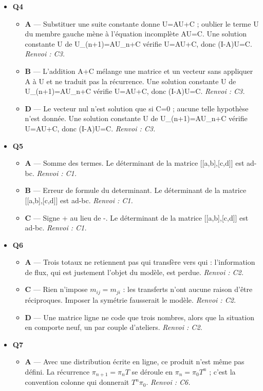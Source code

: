 \begin{itemize}
  \item \textbf{Q4}
  \begin{itemize}
    \item \textbf{A} — Substituer une suite constante donne U=AU+C ; oublier le terme U du membre gauche mène à l'équation incomplète AU=C. Une solution constante U de U\_(n+1)=AU\_n+C vérifie U=AU+C, donc (I-A)U=C. \emph{Renvoi : C3.}
    \item \textbf{B} — L'addition A+C mélange une matrice et un vecteur sans appliquer A à U et ne traduit pas la récurrence. Une solution constante U de U\_(n+1)=AU\_n+C vérifie U=AU+C, donc (I-A)U=C. \emph{Renvoi : C3.}
    \item \textbf{D} — Le vecteur nul n'est solution que si C=0 ; aucune telle hypothèse n'est donnée. Une solution constante U de U\_(n+1)=AU\_n+C vérifie U=AU+C, donc (I-A)U=C. \emph{Renvoi : C3.}
  \end{itemize}
  \item \textbf{Q5}
  \begin{itemize}
    \item \textbf{A} — Somme des termes. Le déterminant de la matrice [[a,b],[c,d]] est ad-bc. \emph{Renvoi : C1.}
    \item \textbf{B} — Erreur de formule du determinant. Le déterminant de la matrice [[a,b],[c,d]] est ad-bc. \emph{Renvoi : C1.}
    \item \textbf{C} — Signe + au lieu de -. Le déterminant de la matrice [[a,b],[c,d]] est ad-bc. \emph{Renvoi : C1.}
  \end{itemize}
  \item \textbf{Q6}
  \begin{itemize}
    \item \textbf{A} — Trois totaux ne retiennent pas qui transfère vers qui : l'information de flux, qui est justement l'objet du modèle, est perdue. \emph{Renvoi : C2.}
    \item \textbf{C} — Rien n'impose $m_{ij}=m_{ji}$ : les transferts n'ont aucune raison d'être réciproques. Imposer la symétrie fausserait le modèle. \emph{Renvoi : C2.}
    \item \textbf{D} — Une matrice ligne ne code que trois nombres, alors que la situation en comporte neuf, un par couple d'ateliers. \emph{Renvoi : C2.}
  \end{itemize}
  \item \textbf{Q7}
  \begin{itemize}
    \item \textbf{A} — Avec une distribution écrite en ligne, ce produit n'est même pas défini. La récurrence $\pi_{n+1}=\pi_nT$ se déroule en $\pi_n=\pi_0T^n$ ; c'est la convention colonne qui donnerait $T^n\pi_0$. \emph{Renvoi : C6.}

\end{itemize}
\end{itemize}
